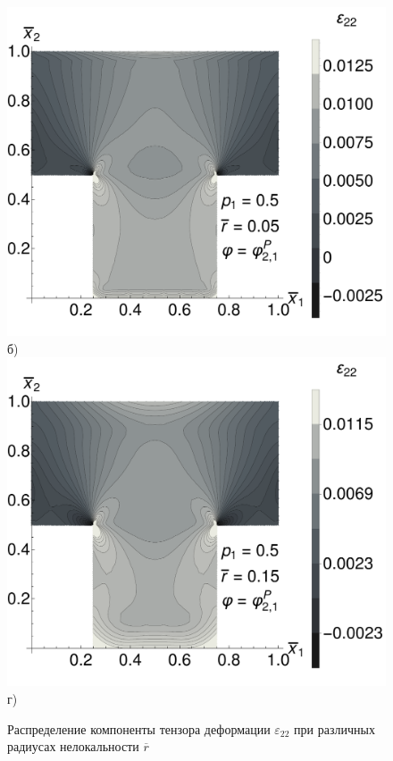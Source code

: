 \begin{figure}[ht]
\begin{minipage}[b][][b]{0.49\linewidth}
        \includegraphics[width=\linewidth]{pics/TEpsR005.pdf} \\ б)
        \includegraphics[width=\linewidth]{pics/TEpsR015.pdf} \\ г)
    \end{minipage}
    \caption{Распределение компоненты тензора деформации $\varepsilon_{22}$ при различных радиусах нелокальности $\overline{r}$}
    \label{fig:TEpsilon}
\end{figure}

